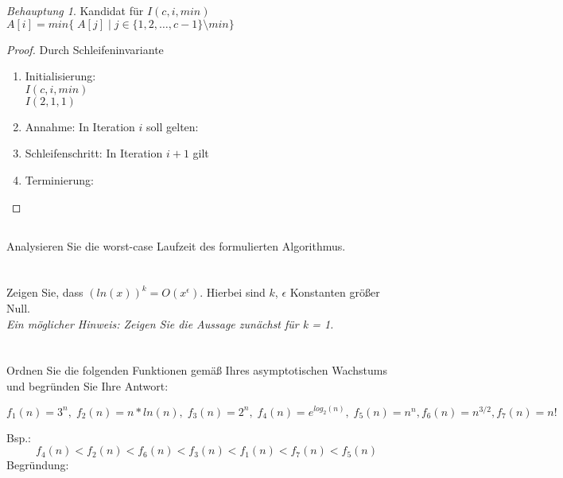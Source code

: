 \documentclass[12pt]{article}
\theoremstyle{remark}
\newtheorem*{Behauptung}{Behauptung}
\begin{document}
\begin{Behauptung}

Kandidat für $I(c,i,min)$ \\
$A[i] = min\{\; A[j] \;| \; j \in \{1,2, \ldots, c - 1\}\setminus min\}$
\end{Behauptung}

\begin{proof}
Durch Schleifeninvariante
\begin{enumerate}
    \item Initialisierung: \\
    $I(c, i, min)$ \\
    $I(2, 1, 1)$ \\
    \item Annahme: In Iteration $i$ soll gelten: 
    
    \item Schleifenschritt:
    In Iteration $i + 1$ gilt 
    \item Terminierung: 
\end{enumerate}
\end{proof}
\subsection{} Analysieren Sie die worst-case Laufzeit des formulierten Algorithmus.

\newpage
\section{}

Zeigen Sie, dass $(ln(x))^k = O(x^\epsilon).$ Hierbei sind $k$, $\epsilon$ Konstanten größer Null. \\ {\it Ein möglicher Hinweis: Zeigen Sie die Aussage zunächst für k = 1.}

\section{}

Ordnen Sie die folgenden Funktionen gemäß Ihres asymptotischen Wachstums und begründen Sie Ihre Antwort:

\[
f_1(n) = 3^n, \; f_2(n) = n*ln(n), \; f_3(n) = 2^n, \; f_4(n) = e^{log_2(n)}, \; f_5(n) = n^n, f_6(n) = n^{3/2}, f_7(n) = n!
\]

Bsp.: \\
\[
f_4(n) < f_2(n) < f_6(n) < f_3(n) < f_1(n) < f_7(n) < f_5(n)
\]
Begründung: \\
\end{document}
